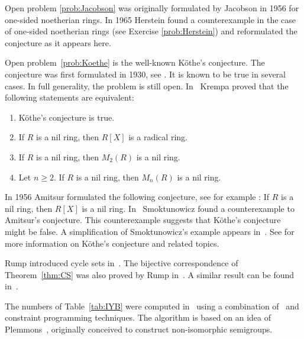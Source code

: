 Open problem \ref{prob:Jacobson} was originally formulated by Jacobson in 1956 \cite{MR0222106} 
for one-sided noetherian rings. In 1965 Herstein \cite{MR188253} found a counterexample
in the case of one-sided noetherian rings (see Exercise \ref{prob:Herstein})
and reformulated the conjecture as it appears here. 

Open problem~\ref{prob:Koethe} is the well-known K\"othe's conjecture. 
The conjecture was first formulated in 1930, see \cite{MR1545158}. It is known to be true
in several cases. In full generality, the problem is still open. In~\cite{MR306251} 
Krempa proved that
the following statements are equivalent:
\begin{enumerate}
	\item K\"othe's conjecture is true.  
	\item If $R$ is a nil ring, then $R[X]$ is a radical ring. 
	\item If $R$ is a nil ring, then $M_2(R)$ is a nil ring. 
	\item Let $n\geq2$. If $R$ is a nil ring, then $M_n(R)$ is a nil ring. 
\end{enumerate}

In 1956 Amitsur formulated the following conjecture, see for example
\cite{MR0347873}: If $R$ is a nil ring, then $R[X]$ is a nil ring. In~\cite{MR1793911} 
Smoktunowicz found a counterexample to Amitsur's conjecture. 
This counterexample suggests that K\"othe's conjecture might be false. 
A simplification of Smoktunowicz's example
appears in~\cite{MR3169522}. See \cite{MR1879880,MR2275597} for more
information on K\"othe's conjecture and related topics. 


Rump introduced cycle sets in~\cite{MR2132760}. The bijective correspondence of 
Theorem~\ref{thm:CS} was 
also proved by Rump in~\cite{MR2132760}. A similar result can be 
found in~\cite[Proposition 2.2]{MR1722951}. 

The numbers of Table~\ref{tab:IYB} were computed in~\cite{MR4405502}
using a combination of~\cite{GAP4} and constraint programming techniques. 
The algorithm is based on an idea of Plemmons~\cite{MR0258994}, originally 
conceived to construct non-isomorphic semigroups.  

